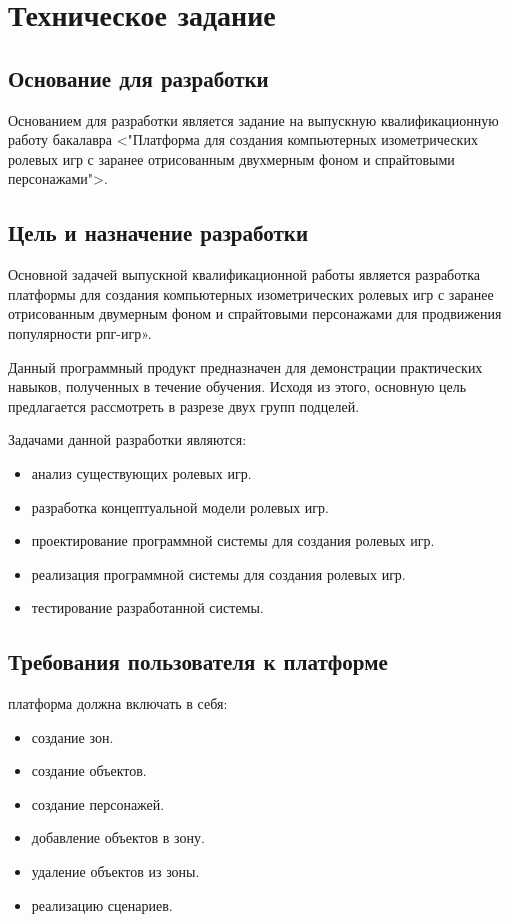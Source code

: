 \section{Техническое задание}
\subsection{Основание для разработки}

Основанием для разработки является задание на выпускную квалификационную работу бакалавра <"Платформа для создания компьютерных изометрических ролевых игр с заранее отрисованным двухмерным фоном и спрайтовыми персонажами">.

\subsection{Цель и назначение разработки}

Основной задачей выпускной квалификационной работы является разработка платформы для создания компьютерных изометрических ролевых игр с заранее отрисованным двумерным фоном и спрайтовыми персонажами для продвижения популярности рпг-игр».

Данный программный продукт предназначен для демонстрации практических навыков, полученных в течение обучения. Исходя из этого, основную цель предлагается рассмотреть в разрезе двух групп подцелей.

Задачами данной разработки являются:
\begin{itemize}
\item анализ существующих ролевых игр.
\item разработка концептуальной модели ролевых игр.
\item проектирование программной системы для создания ролевых игр.
\item реализация программной системы для создания ролевых игр.
\item тестирование разработанной системы.
\end{itemize}

\subsection{Требования пользователя к платформе}

платформа должна включать в себя:
\begin{itemize}
    \item создание зон.
    \item создание объектов.
    \item создание персонажей.
    \item добавление объектов в зону.
    \item удаление объектов из зоны.
    \item реализацию сценариев.
\end{itemize}

